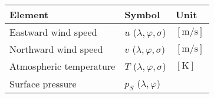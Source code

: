\setlength\LTleft{0pt}\setlength\LTright{0pt}\begin{longtable}[]{@{}lll@{}}
\toprule\relax
\begin{minipage}[b]{0.49\columnwidth}\raggedright
Element\strut
\end{minipage} & \begin{minipage}[b]{0.27\columnwidth}\raggedright
Symbol\strut
\end{minipage} & \begin{minipage}[b]{0.15\columnwidth}\raggedright
Unit\strut
\end{minipage}\tabularnewline
\midrule\relax
\endhead
\begin{minipage}[t]{0.49\columnwidth}\raggedright
Eastward wind speed\strut
\end{minipage} & \begin{minipage}[t]{0.27\columnwidth}\raggedright
\(u\) (\(\lambda,\varphi,\sigma\))\strut
\end{minipage} & \begin{minipage}[t]{0.15\columnwidth}\raggedright
\(\mathrm{[m/s]}\)\strut
\end{minipage}\tabularnewline
\begin{minipage}[t]{0.49\columnwidth}\raggedright
Northward wind speed\strut
\end{minipage} & \begin{minipage}[t]{0.27\columnwidth}\raggedright
\(v\) (\(\lambda,\varphi,\sigma\))\strut
\end{minipage} & \begin{minipage}[t]{0.15\columnwidth}\raggedright
\(\mathrm{[m/s]}\)\strut
\end{minipage}\tabularnewline
\begin{minipage}[t]{0.49\columnwidth}\raggedright
Atmospheric temperature\strut
\end{minipage} & \begin{minipage}[t]{0.27\columnwidth}\raggedright
\(T\) (\(\lambda,\varphi,\sigma\))\strut
\end{minipage} & \begin{minipage}[t]{0.15\columnwidth}\raggedright
\(\mathrm{[K]}\)\strut
\end{minipage}\tabularnewline
\begin{minipage}[t]{0.49\columnwidth}\raggedright
Surface pressure\strut
\end{minipage} & \begin{minipage}[t]{0.27\columnwidth}\raggedright
\(p_S\) (\(\lambda,\varphi\))\strut
\end{minipage} & \begin{minipage}[t]{0.15\columnwidth}\raggedright

\end{minipage}
\end{longtable}
